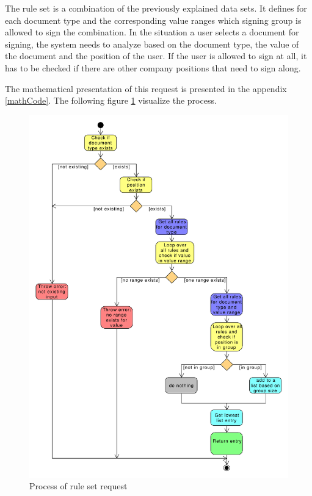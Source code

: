 The rule set is a combination of the previously explained data sets. It defines for each document type and the corresponding value ranges which signing group is allowed to sign the combination. \newline
In the situation a user selects a document for signing, the system needs to analyze based on the document type, the value of the document and the position of the user. If the user is allowed to sign at all, it has to be checked if there are other company positions that need to sign along. 

The mathematical presentation of this request is presented in the appendix \ref{mathCode}. The following figure \ref{fig:visualizationRuleRequest} visualize the process.
\begin{figure}[h!]
	\includegraphics[width=0.8\linewidth]{./design/images/activityRuleSetRequest.pdf}
	\centering
	\caption{Process of rule set request}
	\label{fig:visualizationRuleRequest}
\end{figure}
